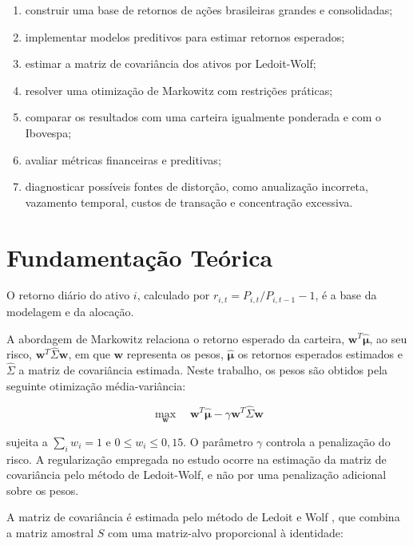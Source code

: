 \documentclass[12pt,a4paper]{article}
\begin{document}
\begin{enumerate}
    \item construir uma base de retornos de ações brasileiras grandes e consolidadas;
    \item implementar modelos preditivos para estimar retornos esperados;
    \item estimar a matriz de covariância dos ativos por Ledoit-Wolf;
    \item resolver uma otimização de Markowitz com restrições práticas;
    \item comparar os resultados com uma carteira igualmente ponderada e com o Ibovespa;
    \item avaliar métricas financeiras e preditivas;
    \item diagnosticar possíveis fontes de distorção, como anualização incorreta, vazamento temporal, custos de transação e concentração excessiva.
\end{enumerate}

\section{Fundamentação Teórica}

O retorno diário do ativo $i$, calculado por $r_{i,t}=P_{i,t}/P_{i,t-1}-1$, é a base da modelagem e da alocação.

A abordagem de Markowitz relaciona o retorno esperado da carteira, $\mathbf{w}^{T}\hat{\boldsymbol{\mu}}$, ao seu risco, $\mathbf{w}^{T}\hat{\Sigma}\mathbf{w}$, em que $\mathbf{w}$ representa os pesos, $\hat{\boldsymbol{\mu}}$ os retornos esperados estimados e $\hat{\Sigma}$ a matriz de covariância estimada. Neste trabalho, os pesos são obtidos pela seguinte otimização média-variância:

\begin{equation}
\max_{\mathbf{w}}\quad
\mathbf{w}^{T}\hat{\boldsymbol{\mu}}
-\gamma\mathbf{w}^{T}\hat{\Sigma}\mathbf{w}
\end{equation}

sujeita a $\sum_i w_i=1$ e $0\leq w_i\leq0{,}15$. O parâmetro $\gamma$ controla a penalização do risco. A regularização empregada no estudo ocorre na estimação da matriz de covariância pelo método de Ledoit-Wolf, e não por uma penalização adicional sobre os pesos.

A matriz de covariância é estimada pelo método de Ledoit e Wolf \cite{ledoitwolf2004}, que combina a matriz amostral $S$ com uma matriz-alvo proporcional à identidade:
\end{document}
